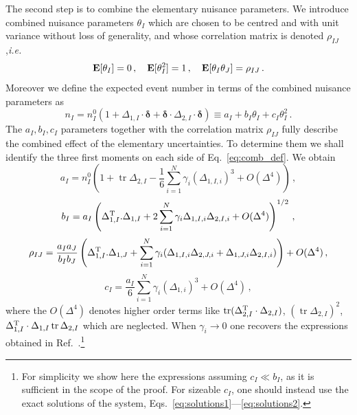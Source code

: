 \documentclass[11pt]{article}
\def\ie{{\it i.e.}}
\newcommand{\be}{\begin{equation}}
\newcommand{\ee}{\end{equation}}
\newcommand{\tr}{\operatorname{tr}}
\begin{document}
The second step is to combine the elementary nuisance parameters. We introduce combined nuisance parameters $\theta_I$ which  are chosen to be centred and with unit variance without loss of generality, and whose correlation matrix  is denoted $\rho_{IJ}$,\ie
\be
 {\bf E}[\theta_I]=0\,, \quad{\bf E}[\theta^2_I]=1\,,\quad{\bf E}[\theta_I \theta_J]=\rho_{IJ}\,.
\ee
Moreover we define the expected event number in terms of the combined nuisance parameters as
\be
n_I=n^{0}_{I}(1+\Delta_{1,I}\cdot\boldsymbol{\delta}+\boldsymbol{\delta}\cdot\Delta_{2,I}\cdot\boldsymbol{\delta}) \equiv
a_I+b_{I}\theta_I+ c_I\theta_I^2 \label{eq:comb_def}\,.
\ee
The $a_I, b_I, c_I$ parameters together with  the correlation matrix $\rho_{IJ}$ fully describe the combined effect of the elementary uncertainties.
%
To determine them we shall identify the three first moments on each side of Eq.~\eqref{eq:comb_def}.
%
%
%
 We obtain
 \be
a_{I}=n^{0}_{I}\left(
1+\tr \Delta_{2,I}-\frac{1}{6}\sum_{i=1}^N \gamma_i(\Delta_{1,I,i})^3+O(\Delta^4) \right) \label{eq:n_comb}
\,,
\ee
\be
b_I=a_I\left(\Delta_{1,I}^{\rm T}.\Delta_{1,I}  +2\sum_{i=1}^N \gamma_i\Delta_{1,I,i}\Delta_{2,I,i}+O(\Delta^4)\right)^{1/2}\,,
\ee
\be
\rho_{IJ}= \frac{a_I a_J}{b_I b_J}\left(\Delta_{1,I}^{\rm T}.\Delta_{1,J}  +\sum_{i=1}^N \gamma_i(\Delta_{1,I,i}\Delta_{2,J,i}+\Delta_{1,J,i}\Delta_{2,I,i})\right)+O(\Delta^4)
\,,
\ee
\be
c_I=\frac{a_I}{6}\sum_{i=1}^N \gamma_i(\Delta_{1,i})^3+O(\Delta^4) \label{eq:gam_comb}\,,
\ee
where the $O(\Delta^4)$ denotes higher order terms like $\tr(\Delta_{2,I}^{\rm T}\cdot\Delta_{2,I})$, $(\tr\Delta_{2,I})^2$, $\Delta_{1,I}^{\rm T}\cdot\Delta_{1,I}\tr\Delta_{2,I}$ which are neglected.
When $\gamma_i\rightarrow 0$  one recovers the expressions obtained in Ref.~\cite{Fichet:2016gvx}.\footnote{For simplicity we show here the expressions assuming $c_I\ll b_I$, as it is sufficient in the scope of the proof. For sizeable $c_I$, one should instead use the exact solutions of the system, Eqs.~\eqref{eq:solutions1}---\eqref{eq:solutions2}.}
\end{document}
